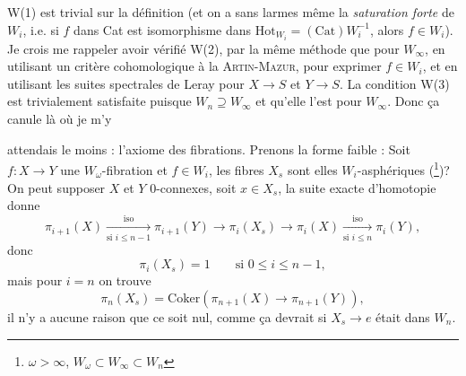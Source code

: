 W(1) est trivial sur la définition (et on a sans larmes même la \textit{saturation forte} de $W_i$, %
i.e. si $f$ dans Cat est isomorphisme dans $\mathrm{Hot}_{W_i} = (\mathrm{Cat})W_i^{-1}$, alors $f \in W_i$). Je crois me rappeler avoir vérifié W(2), par la même méthode que pour $W_\infty$, en utilisant un critère cohomologique à la \textsc{Artin-Mazur}, pour exprimer $f \in W_i$, et en utilisant les suites spectrales de Leray pour $X \longrightarrow S$ et $Y \longrightarrow S$. La condition W(3) est trivialement satisfaite puisque $W_n \supseteq W_\infty$ et qu'elle l'est pour $W_\infty$. Donc ça canule là où je m'y

attendais le moins : l'axiome des fibrations. Prenons la forme faible : Soit $f : X \longrightarrow Y$ une $W_\omega$-fibration et $f \in W_i$, les fibres $X_s$ sont elles $W_i$-asphériques (\footnote[37]{$\omega > \infty$, $W_\omega \subset W_\infty \subset W_n$})? On peut supposer $X$ et $Y$ 0-connexes, soit $x \in X_s$, la suite exacte d'homotopie donne
\[
\pi_{i+1}(X) \xrightarrow[\text{si } i \leq n-1]{\text{iso}} \pi_{i+1}(Y) \longrightarrow \pi_i(X_s) \longrightarrow \pi_i(X) \xrightarrow[\text{si } i \leq n]{\text{iso}} \pi_i(Y),
\]
donc
\[
\pi_i(X_s) = 1 \qquad \text{si } 0 \leq i \leq n-1,
\]
mais pour $i = n$ on trouve
\[
\pi_n(X_s) = \mathrm{Coker}\left(\pi_{n+1}(X) \longrightarrow \pi_{n+1}(Y)\right),
\]
il n'y a aucune raison que ce soit nul, comme ça devrait si $X_s \longrightarrow e$ était dans $W_n$.

